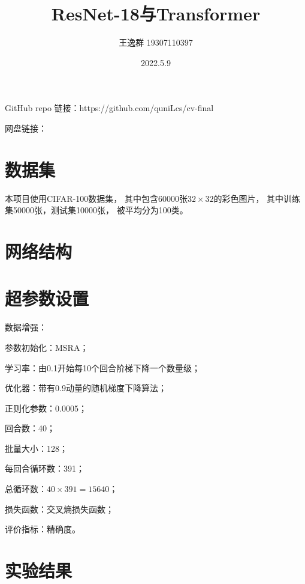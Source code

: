 \documentclass[12pt]{article}
\title{ResNet-18与Transformer}
\author{王逸群 19307110397}
\date{2022.5.9}
\begin{document}
	
\maketitle

GitHub repo 链接：https://github.com/quniLcs/cv-final

网盘链接：

\section{数据集}

本项目使用CIFAR-100数据集，
其中包含60000张$32\times32$的彩色图片，
其中训练集50000张，测试集10000张，
被平均分为100类。

\section{网络结构}

\section{超参数设置}

数据增强：

参数初始化：MSRA；

学习率：由0.1开始每10个回合阶梯下降一个数量级；

优化器：带有0.9动量的随机梯度下降算法；

正则化参数：0.0005；

回合数：40；

批量大小：128；

每回合循环数：391；

总循环数：$ 40 \times 391 = 15640$；

损失函数：交叉熵损失函数；

评价指标：精确度。

\section{实验结果}
	
\end{document}
